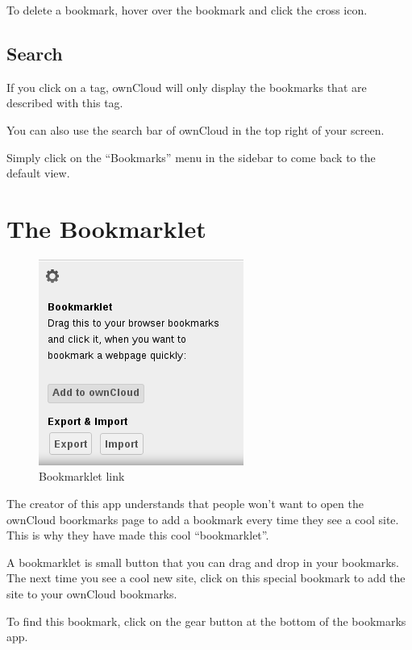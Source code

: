 \documentclass[letterpaper,10pt,english]{sphinxmanual}
\begin{document}
To delete a bookmark, hover over the bookmark and click the cross icon.


\subsection{Search}
\label{bookmarks:search}
If you click on a tag, ownCloud will only display the bookmarks that
are described with this tag.

You can also use the search bar of ownCloud in the top right of your screen.

Simply click on the ``Bookmarks'' menu in the sidebar to come back to
the default view.


\section{The Bookmarklet}
\label{bookmarks:the-bookmarklet}\begin{figure}[htbp]
\centering
\capstart

\includegraphics{bookmark_setting.png}
\caption{Bookmarklet link}\end{figure}

The creator of this app understands that people won't want to
open the ownCloud boorkmarks page to add a bookmark every time they see a cool site.
This is why they have made this cool ``bookmarklet''.

A bookmarklet is small button that you can drag and drop in your bookmarks.
The next time you see a cool new site, click on this special bookmark
to add the site to your ownCloud bookmarks.

To find this bookmark, click on the gear button at the bottom of the bookmarks app.



\renewcommand{\indexname}{Index}
\printindex
\end{document}

